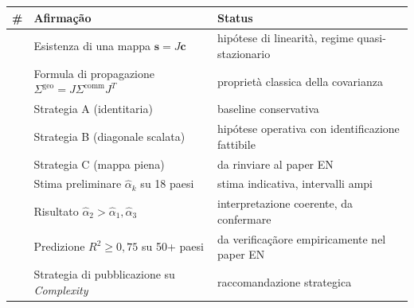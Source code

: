 {\def\LTcaptype{none} %
{\small\begin{longtable}[]{@{}
  >{\raggedright\arraybackslash}p{}
  >{\raggedright\arraybackslash}p{}
  >{\raggedright\arraybackslash}p{}@{}}
\toprule\noalign{}
\begin{minipage}[b]{\linewidth}\raggedright
\#
\end{minipage} & \begin{minipage}[b]{\linewidth}\raggedright
Afirmação
\end{minipage} & \begin{minipage}[b]{\linewidth}\raggedright
Status
\end{minipage} \\
\midrule\noalign{}
\endhead
\bottomrule\noalign{}
\endlastfoot
1 & Esistenza di una mappa \(\mathbf{s} = J \mathbf{c}\) & \Hypoth{}
hipótese di linearità, regime quasi-stazionario \\
2 & Formula di propagazione
\(\Sigma^{\text{geo}} = J \Sigma^{\text{comm}} J^T\) & \Proved{}
proprietà classica della covarianza \\
3 & Strategia A (identitaria) & \Hypoth{} baseline conservativa \\
4 & Strategia B (diagonale scalata) & \Hypoth{} hipótese operativa con
identificazione fattibile \\
5 & Strategia C (mappa piena) & \Conj{} da rinviare al paper EN \\
6 & Stima preliminare \(\hat\alpha_k\) su 18 paesi & \Conj{} stima
indicativa, intervalli ampi \\
7 & Risultato \(\hat\alpha_2 > \hat\alpha_1, \hat\alpha_3\) & \Hypoth{}
interpretazione coerente, da confermare \\
8 & Predizione \(R^2 \geq 0{,}75\) su 50+ paesi & \ToVerify{} da
verificaçãore empiricamente nel paper EN \\
9 & Strategia di pubblicazione su \emph{Complexity} & \Hypoth{}
raccomandazione strategica \\
\end{longtable}}
}


